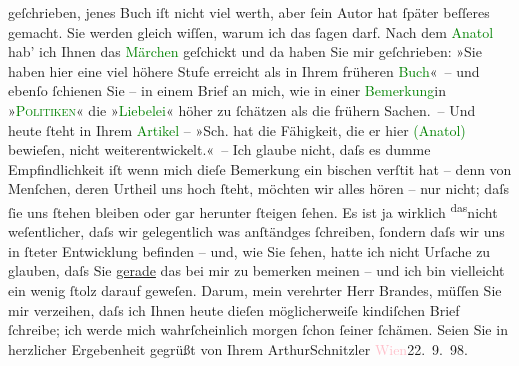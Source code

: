                     geſchrieben, jenes Buch iſt nicht viel werth, aber ſein Autor hat ſpäter
                    beſſeres gemacht. Sie werden gleich wiſſen, warum ich das ſagen darf. Nach dem
                        \textcolor{green}{Anatol}{}\ledrightnote{\textcolor{green}{Anatol}} hab’ ich Ihnen das \textcolor{green}{Märchen}{}\ledrightnote{\textcolor{green}{Das Märchen. Schauspiel in drei Aufzügen}} geſchickt und da haben Sie mir geſchrieben: »Sie
                    haben hier eine viel höhere Stufe erreicht als in Ihrem früheren \textcolor{green}{Buch}{}« – und ebenſo ſchienen Sie – in
                    einem Brief an mich, wie in einer \textcolor{green}{Bemerkung}{}in »\textcolor{green}{\textsc{Politiken}}{}\ledrightnote{\textcolor{green}{Politiken}}« die »\textcolor{green}{Liebelei}{}\ledrightnote{\textcolor{green}{Liebelei. Schauspiel in drei Akten}}« höher zu ſchätzen als
                    die frühern Sachen. – Und heute ſteht in Ihrem \textcolor{green}{Artikel}{} – »Sch. hat die Fähigkeit, die er hier \introOben{}\textcolor{green}{(Anatol)}{}\ledrightnote{\textcolor{green}{Anatol}}\introOben{} bewieſen, nicht weiterentwickelt.« – Ich glaube nicht, daſs es dumme
                    Empfindlichkeit iſt wenn mich dieſe Bemerkung ein bischen verſti{\geminationm}t hat – denn von Menſchen, deren Urtheil uns hoch
                    ſteht, möchten wir alles hören – nur nicht; daſs ſie uns ſtehen bleiben oder gar
                    herunter ſteigen ſehen. Es ist ja wirklich \substVorne{}\textsuperscript{das}\substDazwischen{}nicht\substHinten{} weſentlicher, daſs wir gelegentlich was anſtändges ſchreiben, ſondern
                        {\pb}daſs wir uns in ſteter Entwicklung befinden –
                    und, wie Sie ſehen, hatte ich nicht Urſache zu glauben, daſs Sie \uline{gerade} das bei mir zu bemerken meinen – und ich
                    bin vielleicht ein wenig ſtolz darauf geweſen.\pend
           \pstart
           Darum, mein verehrter Herr Brandes, müſſen Sie mir verzeihen, daſs ich Ihnen
                    heute dieſen möglicherweiſe kindiſchen Brief ſchreibe; ich werde mich
                    wahrſcheinlich morgen ſchon ſeiner ſchämen.\pend
           \pstart Seien Sie in herzlicher Ergebenheit gegrüßt von Ihrem
                        \spacefill\mbox{ArthurSchnitzler}\pend{}\pstart
           \textcolor{pink}{Wien}{}\ledrightnote{\textcolor{pink}{Wien}}{ }22. 9. 98.\pend
           \endnumbering{}  
      